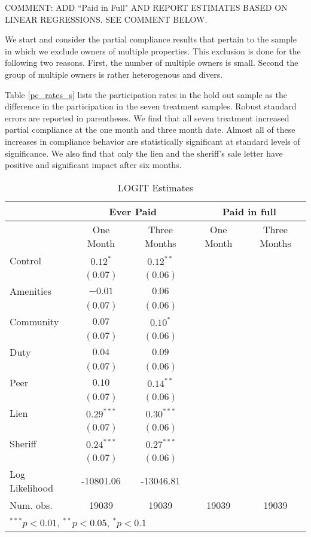 \documentclass[12pt]{article}
\begin{document}
COMMENT: ADD ``Paid in Full" AND REPORT ESTIMATES BASED ON LINEAR REGRESSIONS. SEE COMMENT BELOW.


We start and consider the partial compliance results that pertain to the sample in which we exclude owners of multiple properties. This exclusion is done for the following two reasons. First, the number of multiple owners is small. Second the group of multiple owners is rather heterogenous and divers.

Table \ref{pc_rates_s} lists the participation rates
in the hold out sample as the difference in the participation in the seven treatment samples. Robust 
standard errors are reported in parentheses. We find that all seven treatment increased partial compliance
at the one month and three month date. Almost all of these increases in compliance behavior are statistically 
significant at standard levels of significance. We also find that only the lien and the sheriff's sale letter have positive and significant impact after six months.

\begin{table}[htbp]
\caption{LOGIT Estimates}\label{pc_logit_s}
\begin{center}
\begin{tabular}{l c c c c}
\hline
& \multicolumn{2}{c}{Ever Paid} & \multicolumn{2}{c}{Paid in full} \\
\hline
               & One Month & Three Months & One Month & Three Months \\
\hline
Control        & $0.12^{*}$   & $0.12^{**}$     &&  \\
               & $(0.07)$     & $(0.06)$        &&   \\
Amenities      & $-0.01$      & $0.06$    & &       \\
               & $(0.07)$     & $(0.06)$   & &      \\
Community          & $0.07$       & $0.10^{*}$      & &     \\
               & $(0.07)$     & $(0.06)$   & &       \\
Duty           & $0.04$       & $0.09$   & &        \\
               & $(0.07)$     & $(0.06)$    & &    \\
Peer           & $0.10$       & $0.14^{**}$    & &     \\
               & $(0.07)$     & $(0.06)$   & &    \\
Lien           & $0.29^{***}$ & $0.30^{***}$  & & \\
               & $(0.07)$     & $(0.06)$   & &   \\
Sheriff        & $0.24^{***}$ & $0.27^{***}$  & & \\
               & $(0.07)$     & $(0.06)$    & &     \\
\hline
Log Likelihood & -10801.06    & -13046.81 & &      \\
Num. obs.      & 19039        & 19039         & 19039        & 19039      \\
\hline
\multicolumn{3}{l}{\scriptsize{$^{***}p<0.01$, $^{**}p<0.05$, $^*p<0.1$}}
\end{tabular}
\end{center}
\end{table}
\end{document}
